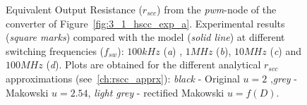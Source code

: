 \begin{figure}[!h]
\centering
    \begin{subfigure}{\textwidth}
        \parbox[c]{.03\linewidth}{\subcaption{}\label{fig:exp_rscc_pwm_node_100kHz}}
        \hspace{.02\linewidth}
        \parbox[c]{.95\linewidth}{
        \centering
        }
    \end{subfigure}

    \begin{subfigure}{\textwidth}
        \parbox[c]{.03\linewidth}{\subcaption{}\label{fig:exp_rscc_pwm_node_1MHz}}
        \hspace{.02\linewidth}
        \parbox[c]{.95\linewidth}{
        \centering
        }
    \end{subfigure}

    \begin{subfigure}{\textwidth}
        \parbox[c]{.03\linewidth}{\subcaption{}\label{fig:exp_rscc_pwm_node_10MHz}}
        \hspace{.02\linewidth}
        \parbox[c]{.95\linewidth}{
        \centering
        }
    \end{subfigure}

    \begin{subfigure}{\textwidth}
        \parbox[c]{.03\linewidth}{\subcaption{}\label{fig:exp_rscc_pwm_node_100MHz}}
        \hspace{.02\linewidth}
        \parbox[c]{.95\linewidth}{
        \centering
        }
    \end{subfigure}

\caption{Equivalent Output Resistance ($r_{scc}$) from the \emph{pwm}-node of the converter of Figure~\ref{fig:3_1_hscc_exp_a}. Experimental results (\emph{square marks}) compared with the model (\emph{solid line}) at different switching frequencies ($f_{sw}$): $100kHz$ (\emph{a}) , $1MHz$ (\emph{b}), $10MHz$ (\emph{c}) and $100MHz$ (\emph{d}). Plots are obtained for the different analytical $r_{scc}$ approximations (see~\ref{ch:rscc_apprx}): \emph{black} - Original $u=2$ ,\emph{grey} - Makowski  $u=2.54$, \emph{light grey} - rectified Makowski $u=f(D)$. }
\label{fig:exp_rscc_pwm_node_dx}
\end{figure}

